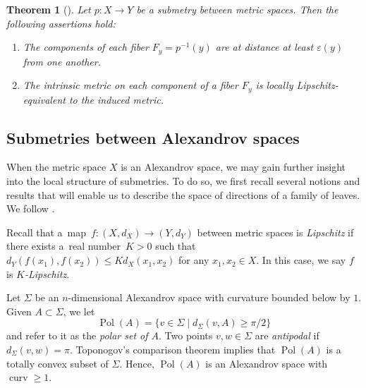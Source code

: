 \documentclass[10pt,a4paper]{amsart}
\numberwithin{equation}{section}
\newtheorem{thm}{Theorem}[section]
\theoremstyle{definition}
\DeclareMathOperator{\curv}{curv}
\DeclareMathOperator{\Pol}{Pol}
\begin{document}
\begin{thm}[]
\label{T: Fibers of submetry have the same metric properties as ambient space}
Let $p\colon X\to Y$ be a submetry between metric spaces. Then the following assertions hold:
\begin{enumerate}\itemsep=0pt
	\item[$(1)$] The components of each fiber $F_y = p^{-1}(y)$ are at distance at least $\varepsilon (y)$ from one another.
	\item[$(2)$] The intrinsic metric on each component of a fiber $F_y$ is locally Lipschitz-equivalent to the induced metric.
\end{enumerate}
\end{thm}



\subsection{Submetries between Alexandrov spaces}
\label{SS:submetries.between.alexandrov.spaces}
When the metric space $X$ is an Alexandrov space, we may gain further insight into the local structure of submetries. To do so, we first recall several notions and results that will enable us to describe the space of directions of a family of leaves. We follow \cite{Lytchak}.

Recall that a~map~${f\colon (X,d_X)\to (Y,d_Y)}$ between metric spaces is \emph{Lipschitz} if there exists a~real number~${K>0}$ such that $d_Y(f(x_1),f(x_2))\leq K d_X(x_1,x_2)$ for any $x_1,x_2\in X$. In this case, we say $f$ is \emph{$K$-Lipschitz}.



Let $\Sigma$ be an $n$-dimensional Alexandrov space with curvature bounded below by $1$.
Given $A\subset \Sigma$, we let
\[
\Pol(A) = \{v\in \Sigma \mid d_{\Sigma}(v,A)\geq \pi/2\}
\]
and refer to it as the \emph{polar set of $A$}.
Two points $v,w\in \Sigma$ are \emph{antipodal} if $d_{\Sigma}(v,w) =\pi$. Toponogov's comparison theorem implies that $\Pol(A)$ is a totally convex subset of $\Sigma$. Hence, $\Pol(A)$ is an Alexandrov space with $\curv\geq 1$.
\end{document}
